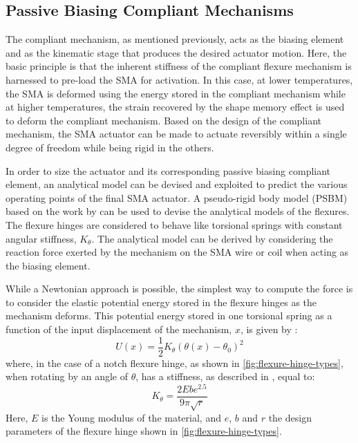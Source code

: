 \subsection{Passive Biasing Compliant Mechanisms}\label{subsec:passive-biasing-compliant-mech}
The compliant mechanism, as mentioned previously, acts as the biasing element and as the kinematic stage that produces the desired actuator motion. Here, the basic principle is that the inherent stiffness of the compliant flexure mechanism is harnessed to pre-load the SMA for activation. In this case, at lower temperatures, the SMA is deformed using the energy stored in the compliant mechanism while at higher temperatures, the strain recovered by the shape memory effect is used to deform the compliant mechanism. Based on the design of the compliant mechanism, the SMA actuator can be made to actuate reversibly within a single degree of freedom while being rigid in the others.

In order to size the actuator and its corresponding passive biasing compliant element, an analytical model can be devised and exploited to predict the various operating points of the final SMA actuator. A pseudo-rigid body model (PSBM) based on the work by \cite{heneinConceptionStructuresArticulees2005} can be used to devise the analytical models of the flexures. The flexure hinges are considered to behave like torsional springs with constant angular stiffness, $K_\theta$. The analytical model can be derived by considering the reaction force exerted by the mechanism on the SMA wire or coil when acting as the biasing element.

While a Newtonian approach is possible, the simplest way to compute the force is to consider the elastic potential energy stored in the flexure hinges as the mechanism deforms. This potential energy stored in one torsional spring as a function of the input displacement of the mechanism, $x$, is given by :
\begin{equation}\label{eq:flexure-pot-energy}
        U(x) = \frac{1}{2}K_{\theta} \left(\theta(x)-\theta_0 \right)^2
\end{equation}
where, in the case of a notch flexure hinge, as shown in \cref{fig:flexure-hinge-types}, when rotating by an angle of $\theta$, has a stiffness, as described in \cite{heneinConceptionStructuresArticulees2005}, equal to:
\begin{equation}\label{eq:flexure-hinge-stiffness}
        K_{\theta} = \frac{2Ebe^{2.5}}{9\pi \sqrt{r}}
\end{equation}
Here, $E$ is the Young modulus of the material, and $e$, $b$ and $r$ the design parameters of the flexure hinge shown in \cref{fig:flexure-hinge-types}.

